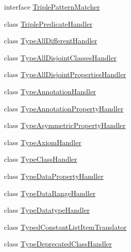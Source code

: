 \begin{DoxyCompactItemize}
interface \hyperlink{interfaceorg_1_1coode_1_1owlapi_1_1rdfxml_1_1parser_1_1_triple_pattern_matcher}{Triple\-Pattern\-Matcher}
\item 
class \hyperlink{classorg_1_1coode_1_1owlapi_1_1rdfxml_1_1parser_1_1_triple_predicate_handler}{Triple\-Predicate\-Handler}
\item 
class \hyperlink{classorg_1_1coode_1_1owlapi_1_1rdfxml_1_1parser_1_1_type_all_different_handler}{Type\-All\-Different\-Handler}
\item 
class \hyperlink{classorg_1_1coode_1_1owlapi_1_1rdfxml_1_1parser_1_1_type_all_disjoint_classes_handler}{Type\-All\-Disjoint\-Classes\-Handler}
\item 
class \hyperlink{classorg_1_1coode_1_1owlapi_1_1rdfxml_1_1parser_1_1_type_all_disjoint_properties_handler}{Type\-All\-Disjoint\-Properties\-Handler}
\item 
class \hyperlink{classorg_1_1coode_1_1owlapi_1_1rdfxml_1_1parser_1_1_type_annotation_handler}{Type\-Annotation\-Handler}
\item 
class \hyperlink{classorg_1_1coode_1_1owlapi_1_1rdfxml_1_1parser_1_1_type_annotation_property_handler}{Type\-Annotation\-Property\-Handler}
\item 
class \hyperlink{classorg_1_1coode_1_1owlapi_1_1rdfxml_1_1parser_1_1_type_asymmetric_property_handler}{Type\-Asymmetric\-Property\-Handler}
\item 
class \hyperlink{classorg_1_1coode_1_1owlapi_1_1rdfxml_1_1parser_1_1_type_axiom_handler}{Type\-Axiom\-Handler}
\item 
class \hyperlink{classorg_1_1coode_1_1owlapi_1_1rdfxml_1_1parser_1_1_type_class_handler}{Type\-Class\-Handler}
\item 
class \hyperlink{classorg_1_1coode_1_1owlapi_1_1rdfxml_1_1parser_1_1_type_data_property_handler}{Type\-Data\-Property\-Handler}
\item 
class \hyperlink{classorg_1_1coode_1_1owlapi_1_1rdfxml_1_1parser_1_1_type_data_range_handler}{Type\-Data\-Range\-Handler}
\item 
class \hyperlink{classorg_1_1coode_1_1owlapi_1_1rdfxml_1_1parser_1_1_type_datatype_handler}{Type\-Datatype\-Handler}
\item 
class \hyperlink{classorg_1_1coode_1_1owlapi_1_1rdfxml_1_1parser_1_1_typed_constant_list_item_translator}{Typed\-Constant\-List\-Item\-Translator}
\item 
class \hyperlink{classorg_1_1coode_1_1owlapi_1_1rdfxml_1_1parser_1_1_type_deprecated_class_handler}{Type\-Deprecated\-Class\-Handler}
\item 

\end{DoxyCompactItemize}
